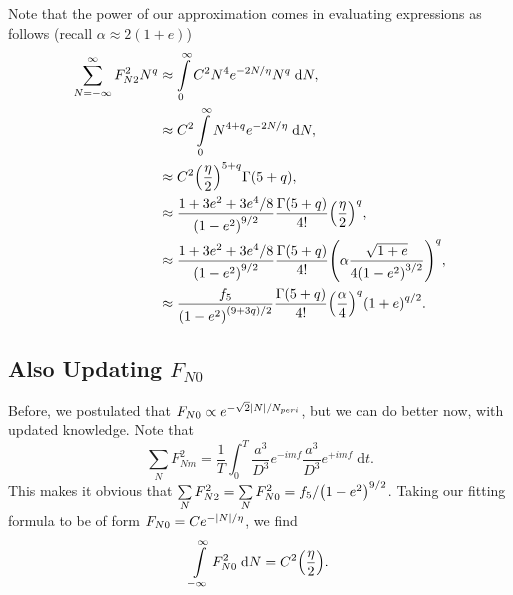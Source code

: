 \documentclass[11pt,
        usenames, %
        dvipsnames %
    ]{article}
\DeclarePairedDelimiter\abs{\lvert}{\rvert}
\DeclarePairedDelimiter\p{\lparen}{\rparen}
\begin{document}
Note that the power of our approximation comes in evaluating expressions as
follows (recall $\alpha \approx 2 (1 + e)$)
\begin{align}
    \sum\limits_{N = -\infty}^\infty F_{N2}^2 N^q
        &\approx \int\limits_0^\infty C^2 N^4 e^{-2 N / \eta}N^q
            \;\mathrm{d}N,\\
        &\approx C^2 \int\limits_{0}^\infty N^{4 + q}
            e^{-2N / \eta}\;\mathrm{d}N,\\
        &\approx C^2 \p*{\frac{\eta}{2}}^{5 + q}\Gamma\p*{5 + q},\\
        &\approx \frac{1 + 3e^2 + 3e^4/8}{\p*{1 - e^2}^{9/2}}
            \frac{\Gamma\p*{5 + q}}{4!}\p*{\frac{\eta}{2}}^q,\\
        &\approx \frac{1 + 3e^2 + 3e^4/8}{\p*{1 - e^2}^{9/2}}
            \frac{\Gamma\p*{5 + q}}{4!}\p*{\alpha\frac{\sqrt{1 + e}}{
                4\p*{1 - e^2}^{3/2}}}^q,\\
        &\approx \frac{f_5}{\p*{1 - e^2}^{(9 + 3q) / 2}}
            \frac{\Gamma\p*{5 + q}}{4!}\p*{\frac{\alpha}{4}}^q
            \p*{1 + e}^{q/2}.\label{eq:fn2_swiss_army_knife}
\end{align}

\subsection{Also Updating $F_{N0}$}

Before, we postulated that $F_{N0} \propto e^{-\sqrt{2}\abs*{N} / N_{peri}}$,
but we can do better now, with updated knowledge. Note that
\begin{equation}
    \sum\limits_N F_{Nm}^2 = \frac{1}{T}\int_0^T
        \frac{a^3}{D^3}e^{-imf}\frac{a^3}{D^3} e^{+imf}\;\mathrm{d}t.
\end{equation}
This makes it obvious that $\sum\limits_N F_{N2}^2 = \sum\limits_N F_{N0}^2 =
f_5 / \p*{1 - e^2}^{9/2}$. Taking our fitting formula to be of form $F_{N0} =
Ce^{-\abs*{N} / \eta}$, we find
\begin{equation}
    \int\limits_{-\infty}^\infty F_{N0}^2\;\mathrm{d}N
        = C^2\p*{\frac{\eta}{2}}.
\end{equation}
\end{document}
